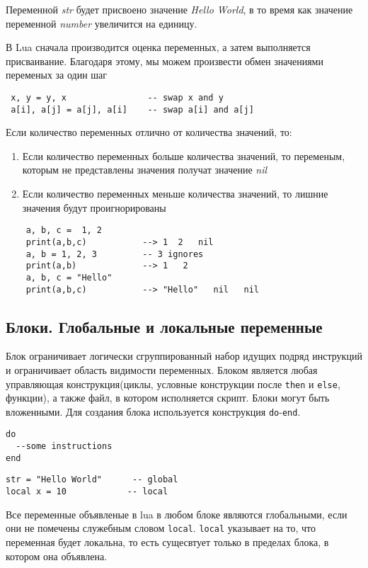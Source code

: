 Переменной \emph{str} будет присвоено значение \emph{Hello World}, в то время как значение переменной \emph{number} увеличится на единицу. 

В Lua сначала производится оценка переменных, а затем выполняется присваивание. Благодаря этому, мы можем произвести обмен значениями переменых за один шаг

\begin{lstlisting}
 x, y = y, x                -- swap x and y
 a[i], a[j] = a[j], a[i]    -- swap a[i] and a[j]
\end{lstlisting}

Если количество переменных отлично от количества значений, то:
\begin{enumerate}
	\item Если количество переменных больше количества значений, то переменым, которым не представлены значения получат значение \emph{nil}
	\item Если количество переменных меньше количества значений, то лишние значения будут проигнорированы
\end{enumerate}

\begin{lstlisting}
    a, b, c =  1, 2
    print(a,b,c)           --> 1  2   nil
    a, b = 1, 2, 3   	   -- 3 ignores
    print(a,b)             --> 1   2
    a, b, c = "Hello"
    print(a,b,c)           --> "Hello"   nil   nil
\end{lstlisting}

\subsection{Блоки. Глобальные и локальные переменные} 

Блок ограничивает логически сгруппированный набор идущих подряд инструкций и ограничивает область видимости переменных. Блоком является любая управляющая конструкция(циклы, условные конструкции после \lstinline{then} и \lstinline{else}, функции), а также файл, в котором исполняется скрипт. Блоки могут быть вложенными. Для создания блока используется конструкция \lstinline{do}-\lstinline{end}.
\begin{lstlisting}
do
  --some instructions
end         
\end{lstlisting}

\begin{lstlisting}
str = "Hello World"      -- global
local x = 10 			-- local
\end{lstlisting}

Все переменные объявленые в lua в любом блоке являются глобальными, если они не помечены служебным словом \lstinline{local}.
\lstinline{local} указывает на то, что переменная будет локальна, то есть сущесвтует только в пределах блока, в котором она объявлена. 

